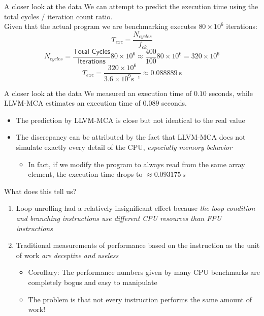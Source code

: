 \begin{frame}{A closer look at the data}
We can attempt to \alert{predict the execution time} using the total cycles / iteration count ratio.\\
\smallskip
Given that the actual program we are benchmarking executes $80\times10^{6}$ iterations:
\[
T_{exc} = \frac{N_{cycles}}{f_{ck}}
\]
\[
N_{cycles} = \frac{\textsf{Total Cycles}}{\textsf{Iterations}}80\times10^{6} \approx \frac{400}{100}80\times10^{6} = 320\times10^{6}
\]
\[
T_{exc} = \frac{320\times10^{6}}{3.6\times10^9 \si{\second}^{-1}} \approx \SI{0.088889}{\second}
\]
\end{frame}


\begin{frame}{A closer look at the data}
We measured an execution time of $0.10$ seconds, while LLVM-MCA estimates an execution time of $0.089$ seconds.
\bigskip
\begin{itemize}
\item The prediction by LLVM-MCA is close but not identical to the real value
\item The discrepancy can be attributed by the fact that LLVM-MCA does not simulate exactly every detail of the CPU, \emph{especially memory behavior}
	\begin{itemize}
	\item In fact, if we modify the program to always read from the same array element,
	the execution time drops to $\approx \SI{0.093175}{\second}$
	\end{itemize}
\end{itemize}
\end{frame}


\begin{frame}{What does this tell us?}
\large
\begin{enumerate}
\item Loop unrolling had a relatively insignificant effect because \emph{the loop condition and branching instructions use different CPU resources than FPU instructions}
\bigskip
\item Traditional measurements of performance based on the instruction as the unit of work \emph{are deceptive and useless}
	\medskip
	\begin{itemize}
	\item Corollary: The performance numbers given by many CPU benchmarks are completely bogus and easy to manipulate
	\item The problem is that not every instruction performs the same amount of work!
	\end{itemize}
\end{enumerate}
\end{frame}


